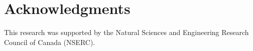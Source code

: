 \section*{Acknowledgments}\label{acknowledgments}

This research was supported by the Natural Sciences and Engineering Research Council of Canada (NSERC).



\address{%
Zeinab Mashreghi\\
University of Winnipeg\\%
Department of Mathematics and Statistics\\ Winnipeg, Canada\\
%
%
\textit{ORCiD: \href{https://orcid.org/0000-0003-0563-0792}{0000-0003-0563-0792}}\\%
\href{mailto:z.mashreghi@uwinnipeg.ca}{\nolinkurl{z.mashreghi@uwinnipeg.ca}}%
}

